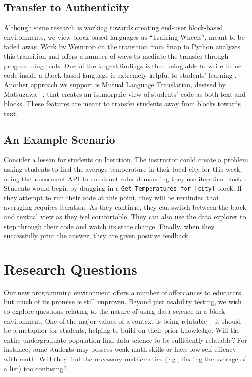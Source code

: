 \documentclass[conference]{IEEEtran}
\begin{document}
\subsection{Transfer to Authenticity}

Although some research is working towards creating end-user block-based environments, we view block-based languages as ``Training Wheels'', meant to be faded away.
Work by Weintrop on the transition from Snap to Python analyzes this transition and offers a number of ways to mediate the transfer through programming tools. 
One of the largest findings is that being able to write inline code inside a Block-based language is extremely helpful to students' learning \cite{Weintrop}.
Another approach we support is Mutual Language Translation, devised by Matsuzawa ~\cite{Matsuzawa}, that creates an isomorphic view of students' code as both text and blocks.
These features are meant to transfer students away from blocks towards text.

\subsection{An Example Scenario}

Consider a lesson for students on Iteration.
The instructor could create a problem asking students to find the average temperature in their local city for this week, using the assessment API to construct rules demanding they use iteration blocks.
Students would begin by dragging in a \texttt{Get Temperatures for [city]} block.
If they attempt to run their code at this point, they will be reminded that averaging requires iteration.
As they continue, they can switch between the block and textual view as they feel comfortable.
They can also use the data explorer to step through their code and watch its state change.
Finally, when they successfully print the answer, they are given positive feedback.
	
\section{Research Questions}

Our new programming environment offers a number of affordances to educators, but much of its promise is still unproven.
Beyond just usability testing, we wish to explore questions relating to the nature of using data science in a block environment.
One of the major values of a context is being relatable -- it should be a metaphor for students, helping to build on their prior knowledge. Will the entire undergraduate population find data science to be sufficiently relatable? For instance, some students may possess weak math skills or have low self-efficacy with math. Will they find the necessary mathematics (e.g., finding the average of a list) too confusing?
\end{document}
